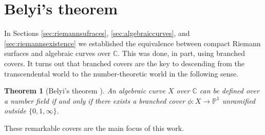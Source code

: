 \documentclass{dcthesis}
\newcommand{\PP}{\mathbb P}
\newcommand{\CC}{\mathbb C}
\numberwithin{equation}{section}
\newtheorem{theorem}[equation]{Theorem}
\theoremstyle{definition}
\theoremstyle{remark}
\begin{document}
{  \section{Belyi's theorem}{\label{sec:belyistheorem}
    In Sections
    \ref{sec:riemannsufraces}, \ref{sec:algebraiccurves},
    and \ref{sec:riemannsexistence}
    we established the equivalence between
    compact Riemann surfaces and algebraic curves over $\CC$.
    This was done, in part,
    using branched covers.
    It turns out that branched covers are the key
    to descending from the transcendental world to
    the number-theoretic world in the following sense.
    \begin{theorem}[Belyi's theorem \cite{belyi}]\label{thm:belyistheorem}
      An algebraic curve $X$ over $\CC$ can be defined over a number field
      if and only if there exists a branched cover
      $\phi\colon X\to\PP^1$ unramified outside
      $\{0,1,\infty\}$.
    \end{theorem}
    These remarkable covers are the main focus of this work.
  }
}
\end{document}
